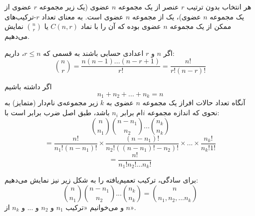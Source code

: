 
\begin{definition}
    \p
    هر انتخاب بدون ترتیب
    $r$
    عنصر از یک مجموعه
    $n$
    عضوی
    (یک زیر مجموعه $r$ عضوی از یک مجموعه $n$ عضوی)،
    یک
    از مجموعه
    $n$
    عضوی است.
    به معنای تعداد
    $r$-ترکیب‌های ممکن
    از یک مجموعه $n$ عضوی
    بوده که آن را با نماد 
    $C(n,r)$ یا 
    ${n\choose r}$ نمایش می‌دهیم. 
\end{definition}

\begin{fact}
    \p
    اگر $n$ و $r$ اعدادی حسابی باشند به قسمی که 
    $r\leq n$، داریم:
    $${n \choose r} = \frac{n(n-1)...(n-r+1)}{r!} = \frac{n!}{r!(n-r)!}$$
\end{fact}




\begin{fact}
    \p
    اگر داشته باشیم
    $$n_{1} + n_{2} + ... + n_{k} = n$$
    آنگاه تعداد حالات افراز یک مجموعه $n$ عضوی
    به $k$ زیر مجموعه‌ی نام‌دار (متمایز) به نحوی که
    اندازه مجموعه
    $i$ام
    برابر $n_{i}$
    باشد، طبق اصل ضرب برابر است با:
    $${n \choose n_{1}} {n-n_{1} \choose n_{2}} ... {n_{k} \choose n_{k}}$$
    $$= \frac{n!}{n_{1}!(n-n_{1})!} \times \frac{(n-n_{1})!}{n_{2}!((n-n_{1})!-n_{2})!} \times ... \times \frac{n_{k}!}{n_{k}!1!}$$
    $$= \frac{n!}{n_{1}!n_{2}! ... n_{k}!}$$
\end{fact}

\begin{definition}
    \p
    برای سادگی، ترکیب تعمیم‌یافته را به شکل زیر نیز نمایش می‌دهیم:
    $${n \choose n_{1}} {n-n_{1} \choose n_{2}} ... {n_{k} \choose n_{k}} = {n \choose n_{1},n_{2}, ... n_{k}}$$
    و می‌خوانیم
    «ترکیب $n_1$ و $n_2$ و ... و $n_k$ از $n$».
\end{definition}



